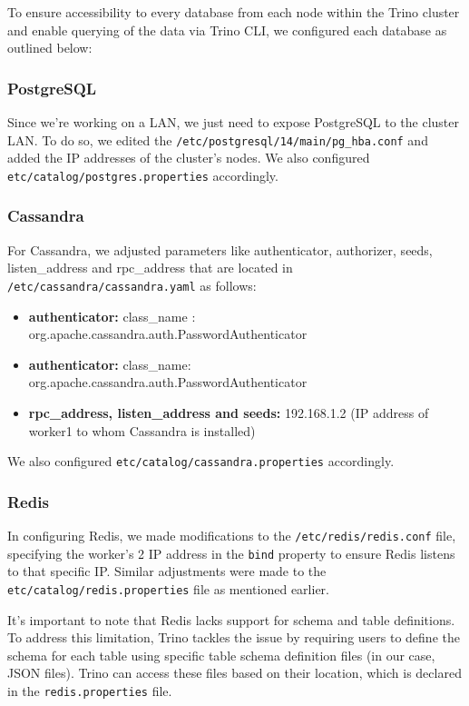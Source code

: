 \documentclass[conference]{IEEEtran}
\begin{document}
To ensure accessibility to every database from each node within the Trino cluster and enable querying of the data via Trino CLI, we configured each database as outlined below:

\subsubsection{PostgreSQL}

Since we're working on a LAN, we just need to expose PostgreSQL to the cluster LAN. To do so, we edited the \texttt{/etc/postgresql/14/main/pg\_hba.conf} and added
the IP addresses of the cluster's nodes. We also configured \texttt{etc/catalog/postgres.properties} accordingly.

\subsubsection{Cassandra}

For Cassandra, we adjusted parameters like authenticator, authorizer, seeds, listen\_address and rpc\_address that are located in \texttt{/etc/cassandra/cassandra.yaml} as follows:

\begin{itemize}
    \item \textbf{authenticator:} class\_name : org.apache.cassandra.auth.PasswordAuthenticator
    \item \textbf{authenticator:}
        class\_name: org.apache.cassandra.auth.PasswordAuthenticator
    \item \textbf{rpc\_address, listen\_address and seeds:} 192.168.1.2 (IP address of worker1 to whom Cassandra is installed)
\end{itemize}

We also configured \texttt{etc/catalog/cassandra.properties} accordingly. 

\subsubsection{Redis}


In configuring Redis, we made modifications to the \texttt{/etc/redis/redis.conf} file, specifying the worker's 2 IP address in the \texttt{bind} property 
to ensure Redis listens to that specific IP. Similar adjustments were made to the \texttt{etc/catalog/redis.properties} file as mentioned earlier.

It's important to note that Redis lacks support for schema and table definitions. To address this limitation, Trino tackles the issue by requiring users to 
define the schema for each table using specific table schema definition files (in our case, JSON files). Trino can access these files based on their location, which is declared in the \texttt{redis.properties} file.
\end{document}
